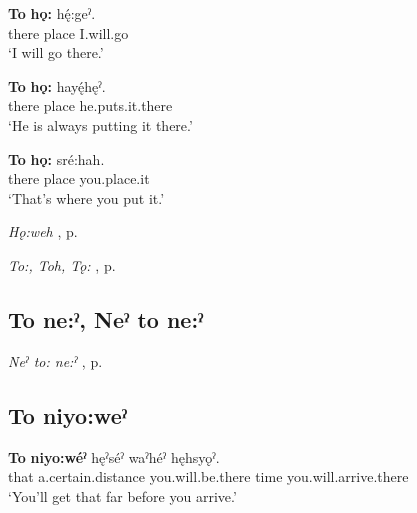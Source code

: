 \ea
\label{ex:tpart90}
\gll \textbf{To} \textbf{hǫ:} hę́:geˀ.\\
there place I.will.go\\
\glt ‘I will go there.’
\z

\ea
\label{ex:tpart91}
\gll \textbf{To} \textbf{hǫ:} hayę́hęˀ.\\
there place he.puts.it.there\\
\glt ‘He is always putting it there.’
\z

\ea
\label{ex:tpart92}
\gll \textbf{To} \textbf{hǫ:} sré:hah.\\
there place you.place.it\\
\glt ‘That’s where you put it.’
\z

\begin{CayugaRelated}
\item \textit{Hǫ:weh} , p. \pageref{p:[hǫ:weh]}\\
\item \textit{To:, Toh, Tǫ:} , p. \pageref{p:[to:] ‘that one’}
\end{CayugaRelated}

\subsection*{\textbf{To ne:ˀ, Neˀ to ne:ˀ} } \label{p:[to: ne:ˀ]}

\begin{CayugaRelated}
\item \textit{Neˀ to: ne:ˀ} , p. \pageref{p:[neˀ to: ne:ˀ]}
\end{CayugaRelated}


\subsection*{\textbf{To niyo:weˀ} } \label{p:[toh niyo:weˀ]}

\ea
\label{ex:tpart93}
\gll \textbf{To} \textbf{niyo:wéˀ} hęˀséˀ waˀhéˀ hęhsyǫˀ.\\
that a.certain.distance you.will.be.there time you.will.arrive.there\\
\glt ‘You’ll get that far before you arrive.’
\z

